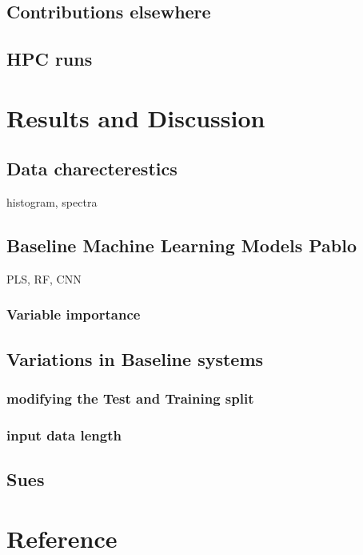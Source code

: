 \documentclass[12pt,a4paper]{article}
\begin{document}
\section{Contributions elsewhere}
\section{HPC runs}


\chapter{Results and Discussion}

\section{Data charecterestics}
histogram, spectra
\section{Baseline Machine Learning Models Pablo}
PLS, RF, CNN

\subsection{Variable importance}

\section{ Variations in Baseline systems}
\subsection{ modifying the Test and Training split}
\subsection{ input data length}

\section{Sues}

\chapter{Reference}
\end{document}
